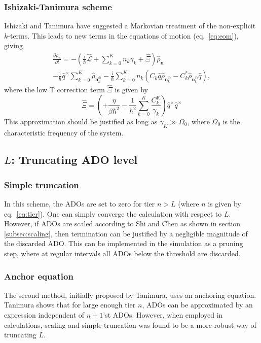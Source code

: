 \subsubsection{Ishizaki-Tanimura scheme}
Ishizaki and Tanimura have suggested a Markovian treatment of the non-explicit $k$-terms.\supercite{Ishizaki2005,Ishizaki2006, Tanimura2006a} This leads to new terms in the equations of motion (eq.~\ref{eq:eom}), giving
\begin{multline}
	\frac{\partial \hat{\rho}_{\bm{n}} }{\partial t} =
	-\left(
		\frac{\mathrm{i}}{\hbar}\hat{\mathcal{L}}
		+\sum_{k=0}^{K}n_k \gamma_k
		+\hat{\Xi}
	\right)\hat{\rho}_{\bm{n}} \\
	-\frac{\mathrm{i}}{\hbar}\hat{q}^\times \sum_{k=0}^{K}\hat{\rho}_{\bm{n}_k^\oplus}
	-\frac{\mathrm{i}}{\hbar}\sum_{k=0}^{K}n_k\left(C_k\hat{q}\hat{\rho}_{\bm{n}_k^\ominus}-C_k^*\hat{\rho}_{\bm{n}_k^\ominus}\hat{q}\right),
	\label{eq:low_temp_correction}
\end{multline}
where the low T correction term $\hat{\Xi}$ is given by
\begin{equation}
	\hat{\Xi} = \left(+\frac{\eta}{\beta\hbar^2}
	-\frac{1}{\hbar^2}\sum_{k=0}^{K} \frac{C_k^\mathrm{R}}{\gamma_k}\right)\hat{q}^\times\hat{q}^\times
\end{equation}
This approximation should be justified as long as $\gamma_K \gg \Omega_0$, where $\Omega_0$ is the characteristic frequency of the system.\supercite{Ishizaki2005}


\subsection{$L$: Truncating ADO level}\label{subsec:L_truncation}
\subsubsection{Simple truncation}
In this scheme, the ADOs are set to zero for tier $n>L$ (where $n$ is given by eq.~\ref{eq:tier}). One can simply converge the calculation with respect to $L$. However, if ADOs are scaled according to Shi and Chen as shown in section \ref{subsec:scaling}, then termination can be justified by a negligible magnitude of the discarded ADO. This can be implemented in the simulation as a pruning step, where at regular intervals all ADOs below the threshold are discarded.
\subsubsection{Anchor equation}
The second method, initially proposed by Tanimura,\supercite{Tanimura1991a,Ishizaki2005} uses an anchoring equation. Tanimura shows that for large enough tier $n$, ADOs can be approximated by an expression independent of $n+1$'st ADOs. However, when employed in calculations, scaling and simple truncation was found to be a more robust way of truncating $L$.
\newpage
